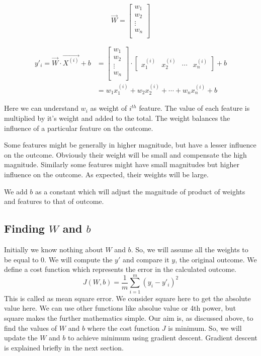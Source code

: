 \begin{equation}
    \vec{W} = \begin{bmatrix}
        w_{1} \\ 
        w_{2} \\
        \vdots \\
        w_{n} \\
    \end{bmatrix}
\end{equation}

\begin{equation}
    \begin{split}
    y'_{i} = 
        \vec{W} \cdot \vec{X^{(i)}} + b
        &= 
    \begin{bmatrix}
        w_{1} \\ 
        w_{2} \\
        \vdots \\
        w_{n} \\
    \end{bmatrix}
    \cdot
    \begin{bmatrix}
        x_{1}^{(i)} & x_{2}^{(i)} & \cdots & x_{n}^{(i)}
    \end{bmatrix} + b \\
    &= w_{1}x_{1}^{(i)} + w_{2}x_{2}^{(i)} + \cdots + w_{n}x_{n}^{(i)} + b
\end{split}
\end{equation}

Here we can understand $w_{i}$ as weight of $i^{th}$ feature. The value of each
 feature is multiplied by it's weight and added to the total.
The weight balances the influence of a particular feature on the outcome.

Some features might be generally in higher magnitude, but have a lesser influence
on the outcome. Obviously their weight will be small and compensate the high magnitude.
Similarly some features might have small magnitudes but higher influence on the outcome.
As expected, their weights will be large.

We add $b$ as a constant which will adjust the magnitude of product of weights and features to that of outcome.

\subsection{Finding $W$ and $b$}
Initially we know nothing about $W$ and $b$. So, we will assume all the weights to be equal to $0$.
We will compute the $y'$ and compare it $y$, the original outcome. We define a cost function which 
represents the error in the calculated outcome.
\begin{equation}
    J(W,b) = \frac{1}{m}\sum_{i=1}^{m}{(y_i-y'_i)}^{2}
\end{equation}
This is called as mean square error. We consider square here to get the absolute value here. We can use other 
functions like absolue value or 4th power, but square makes the further mathematics simple.
Our aim is, as discussed above, to find the values of $W$ and $b$ where the cost function $J$
is minimum. So, we will update the $W$ and $b$ to achieve minimum using gradient descent. Gradient descent is explained briefly in the next section.

